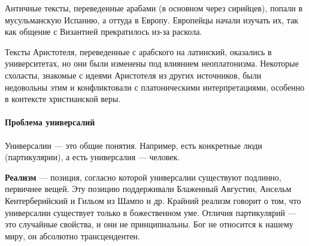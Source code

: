 Античные тексты, переведенные арабами (в основном через сирийцев), попали в мусульманскую Испанию, а оттуда в Европу. Европейцы начали изучать их, так как общение с Византией прекратилось из-за раскола. 

Тексты Аристотеля, переведенные с арабского на латинский, оказались в университетах, но они были изменены под влиянием неоплатонизма. Некоторые схоласты, знакомые с идеями Аристотеля из других источников, были недовольны этим и конфликтовали с платоническими интерпретациями, особенно в контексте христианской веры.

\paragraph{Проблема универсалий}

Универсалии --- это общие понятия. 
Например, есть конкретные люди (партикулярии), а есть универсалия --- человек. 


\textbf{Реализм} --- позиция, согласно которой универсалии существуют подлинно, первичнее вещей. 
Эту позицию поддерживали Блаженный Августин, Ансельм Кентерберийский и Гильом из Шампо и др. 
Крайний реализм говорит о том, что универсалии существует только в божественном
уме. 
Отличия партикулярий --- это случайные свойства, и они не принципиальны. 
Бог не относится к нашему миру, он абсолютно трансцендентен. 

